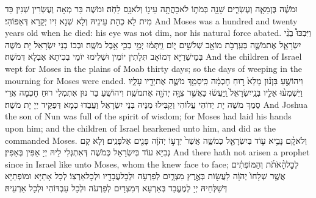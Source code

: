 {וּמֹשֶׁ֗ה בֶּן\maqqaf מֵאָ֧ה וְעֶשְׂרִ֛ים שָׁנָ֖ה בְּמֹת֑וֹ לֹא\maqqaf כָהֲתָ֥ה עֵינ֖וֹ וְלֹא\maqqaf נָ֥ס לֵחֹֽה׃}
{וּמֹשֶׁה בַּר מְאָה וְעֶשְׂרִין שְׁנִין כַּד מִית לָא כְהָת עֵינֵיהּ וְלָא שְׁנָא זִיו יְקָרָא דְּאַפּוֹהִי׃}
{And Moses was a hundred and twenty years old when he died: his eye was not dim, nor his natural force abated.}{}
{וַיִּבְכּוּ֩ בְנֵ֨י יִשְׂרָאֵ֧ל אֶת\maqqaf מֹשֶׁ֛ה בְּעַֽרְבֹ֥ת מוֹאָ֖ב שְׁלֹשִׁ֣ים י֑וֹם וַֽיִּתְּמ֔וּ יְמֵ֥י בְכִ֖י אֵ֥בֶל מֹשֶֽׁה׃}
{וּבְכוֹ בְנֵי יִשְׂרָאֵל יָת מֹשֶׁה בְּמֵישְׁרַיָּא דְּמוֹאָב תְּלָתִין יוֹמִין וּשְׁלִימוּ יוֹמֵי בְכִיתָא אֶבְלָא דְּמֹשֶׁה׃}
{And the children of Israel wept for Moses in the plains of Moab thirty days; so the days of weeping in the mourning for Moses were ended.}{}
{וִיהוֹשֻׁ֣עַ בִּן\maqqaf נ֗וּן מָלֵא֙ ר֣וּחַ חׇכְמָ֔ה כִּֽי\maqqaf סָמַ֥ךְ מֹשֶׁ֛ה אֶת\maqqaf יָדָ֖יו עָלָ֑יו וַיִּשְׁמְע֨וּ אֵלָ֤יו בְּנֵֽי\maqqaf יִשְׂרָאֵל֙ וַֽיַּעֲשׂ֔וּ כַּאֲשֶׁ֛ר צִוָּ֥ה יְהֹוָ֖ה אֶת\maqqaf מֹשֶֽׁה׃}
{וִיהוֹשֻׁעַ בַּר נוּן אִתְמְלִי רוּחַ חָכְמָה אֲרֵי סְמַךְ מֹשֶׁה יָת יְדוֹהִי עֲלוֹהִי וְקַבִּילוּ מִנֵּיהּ בְּנֵי יִשְׂרָאֵל וַעֲבַדוּ כְּמָא דְּפַקֵּיד יְיָ יָת מֹשֶׁה׃}
{And Joshua the son of Nun was full of the spirit of wisdom; for Moses had laid his hands upon him; and the children of Israel hearkened unto him, and did as the \lord\space commanded Moses.}{}
{וְלֹא\maqqaf קָ֨ם נָבִ֥יא ע֛וֹד בְּיִשְׂרָאֵ֖ל כְּמֹשֶׁ֑ה אֲשֶׁר֙ יְדָע֣וֹ יְהֹוָ֔ה פָּנִ֖ים אֶל\maqqaf פָּנִֽים׃}
{וְלָא קָם נְבִיָּא עוֹד בְּיִשְׂרָאֵל כְּמֹשֶׁה דְּאִתְגְּלִי לֵיהּ יְיָ אַפִּין בְּאַפִּין׃}
{And there hath not arisen a prophet since in Israel like unto Moses, whom the \lord\space knew face to face;}{}
{לְכׇל\maqqaf הָ֨אֹתֹ֜ת וְהַמּוֹפְתִ֗ים אֲשֶׁ֤ר שְׁלָחוֹ֙ יְהֹוָ֔ה לַעֲשׂ֖וֹת בְּאֶ֣רֶץ מִצְרָ֑יִם לְפַרְעֹ֥ה וּלְכׇל\maqqaf עֲבָדָ֖יו וּלְכׇל\maqqaf אַרְצֽוֹ׃}
{לְכָל אָתַיָּא וּמוֹפְתַיָּא דְּשַׁלְּחֵיהּ יְיָ לְמֶעֱבַד בְּאַרְעָא דְּמִצְרָיִם לְפַרְעֹה וּלְכָל עַבְדּוֹהִי וּלְכָל אַרְעֵיהּ׃}
